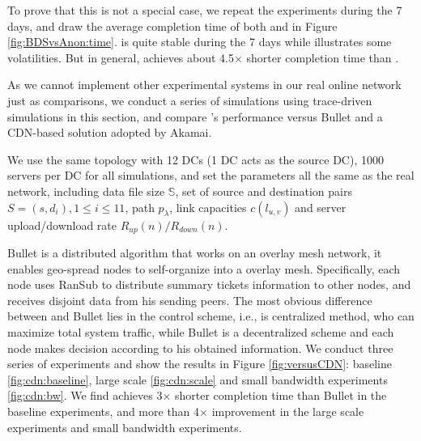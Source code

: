 To prove that this is not a special case, we repeat the experiments during the 7 days, and draw the average completion time of both \name and \company in Figure \ref{fig:BDSvsAnon:time}. \name is quite stable during the 7 days while \company illustrates some volatilities. But in general, \name achieves about 4.5$\times$ shorter completion time than \company.


As we cannot implement other experimental systems in our real online network just as comparisons, we conduct a series of simulations using trace-driven simulations in this section, and compare \name's performance versus Bullet \cite{kostic2003bullet} and a CDN-based solution \cite{Andreev2013Designing} adopted by Akamai.

We use the same topology with 12 DCs (1 DC acts as the source DC), 1000 servers per DC for all simulations, and set the parameters all the same as the real network, including data file size $\mathbb{S}$, set of source and destination pairs $S=(s,d_i),1\leq i \leq 11$, path $p_\lambda$, link capacities $c(l_{u,v})$ and server upload/download rate $R_{up}(n)/R_{down}(n)$.

Bullet \cite{kostic2003bullet} is a distributed algorithm that works on an overlay mesh network, it enables geo-spread nodes to self-organize into a overlay mesh. Specifically, each node uses RanSub \cite{Rodriguez2003Using} to distribute summary tickets information to other nodes, and receives disjoint data from his sending peers. The most obvious difference between \name and Bullet lies in the control scheme, i.e., \name is centralized method, who can maximize total system traffic, while Bullet is a decentralized scheme and each node makes decision according to his obtained information. We conduct three series of experiments and show the results in Figure \ref{fig:versusCDN}: baseline \ref{fig:cdn:baseline}, large scale \ref{fig:cdn:scale} and small bandwidth experiments \ref{fig:cdn:bw}. We find \name achieves 3$\times$ shorter completion time than Bullet in the baseline experiments, and more than 4$\times$ improvement in the large scale experiments and small bandwidth experiments.


